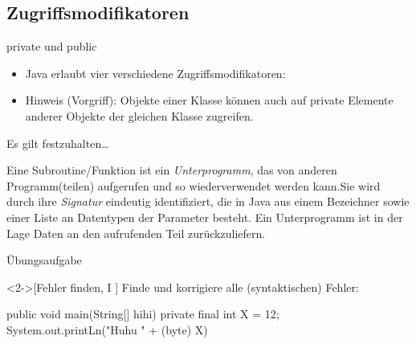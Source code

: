 \subsection{Zugriffsmodifikatoren}

\begin{frame}{private und public}
    \begin{itemize}[<+(1)->]
        \item Java erlaubt vier verschiedene Zugriffsmodifikatoren: 
        \item Hinweis (Vorgriff):\pause{} Objekte einer Klasse können auch auf private Elemente anderer Objekte der gleichen Klasse zugreifen.
    \end{itemize}
\end{frame}

\begin{frame}[c]{Es gilt festzuhalten\ldots}
    \begin{definition}[Subroutinen]
        Eine Subroutine/Funktion ist ein \emph{Unterprogramm},\pause{} das von anderen Programm(teilen) aufgerufen und so wiederverwendet werden kann.\pause{}\medskip\newline Sie wird durch ihre \emph{Signatur} eindeutig identifiziert,\pause{} die in Java aus einem Bezeichner sowie einer Liste an Datentypen der Parameter besteht. Ein Unterprogramm ist in der Lage Daten an den aufrufenden Teil zurückzuliefern.
    \end{definition}
\end{frame}

\ifull
\begin{frame}[c,fragile]{Übungsaufgabe}
    \begin{exercise}<2->[Fehler finden, I ]
        \pause{}Finde und korrigiere alle (syntaktischen) Fehler:\pause{}
        \begin{plainvoid}
public void main(String[] hihi) {
    private final int X = 12;
    System.out.printLn("Huhu " + (byte) X)
}
        \end{plainvoid}
    \end{exercise}
\end{frame}

